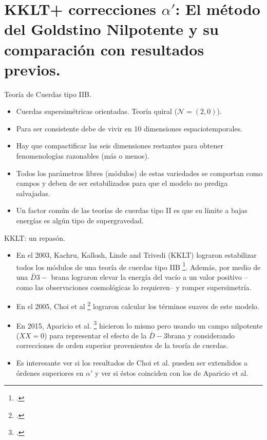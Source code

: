 \documentclass[10pt,a4paper]{beamer}
\begin{document}
\section{KKLT+ correcciones $\alpha'$: El método del Goldstino Nilpotente y su
comparación con resultados previos.}
\label{sec:KKLT}
\begin{frame}{Teoría de Cuerdas tipo IIB.}
\begin{itemize}
  \item Cuerdas supersimétricas orientadas. Teoría quiral ($\mathcal{N} =
    (2,0)$).
  \item Para ser consistente debe de vivir en 10 dimensiones espaciotemporales.
  \item Hay que compactificar las seis dimensiones restantes para obtener
    fenomenologías razonables (más o menos).
  \item Todos los parámetros libres (módulos) de estas variedades se comportan
    como campos y deben de ser estabilizados para que el modelo no prediga
    salvajadas.
  \item Un factor común de las teorías de cuerdas tipo II es que su límite a
    bajas energías es algún tipo de supergravedad.
\end{itemize}

\end{frame}
\begin{frame}{KKLT: un repasón.}
\begin{itemize}
  \item En el 2003, Kachru, Kallosh, Linde and Trivedi (KKLT) lograron
    estabilizar todos los módulos de una teoría de cuerdas tipo IIB
    \footcite{KKLT}. Además, por
    medio de una  $\bar D3-$ brana lograron elevar la energía del vacío a un
    valor positivo  --como las observaciones cosmológicas lo requieren-- y
    romper supersimetría. 
  \item En el 2005, Choi et al \footcite{Nilles} lograron calcular los términos
    suaves de este modelo.
  \item En 2015, Aparicio et al. \footcite{peiper} hicieron lo mismo pero usando
  un campo nilpotente ($XX=0$) para representar el efecto de la $\bar D -3$brana
y considerando correcciones de orden superior provenientes de la teoría de
cuerdas.
\item Es interesante ver si los resultados de Choi et al. pueden ser extendidos
  a órdenes superiores en $\alpha'$ y ver si éstos coinciden con los de Aparicio
  et al.
\end{itemize}
\end{frame}
\end{document}
